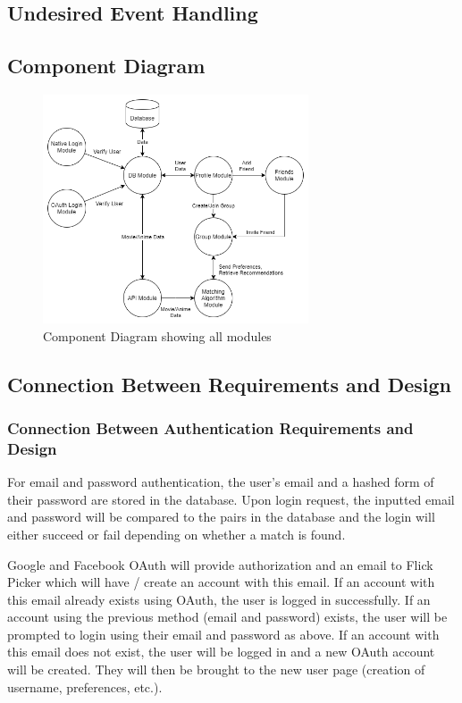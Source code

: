 \documentclass[12pt, titlepage]{article}
\begin{document}
\subsection{Undesired Event Handling}


\subsection{Component Diagram}
\begin{figure}[H]
	\centering
	\includegraphics[width=0.7\textwidth]{ComponentDiagram.png}
	\caption{Component Diagram showing all modules}
	\label{FigUH}
\end{figure}

\subsection{Connection Between Requirements and Design} \label{SecConnection}

\subsubsection{Connection Between Authentication Requirements and Design}
\hspace*{14pt} For email and password authentication, the user's email and a hashed form of their password are stored in the database. Upon login request, the inputted email and password will be compared to the pairs in the database and the login will either succeed or fail depending on whether a match is found. 

Google and Facebook OAuth will provide authorization and an email to Flick Picker which will have / create an account with this email. If an account with this email already exists using OAuth, the user is logged in successfully. If an account using the previous method (email and password) exists, the user will be prompted to login using their email and password as above. If an account with this email does not exist, the user will be logged in and a new OAuth account will be created. They will then be brought to the new user page (creation of username, preferences, etc.). 
\end{document}
